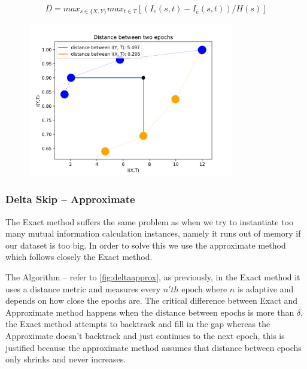   \begin{equation}
    D = max_{s\in\{X, Y\}} max_{t\in T} [(I_e(s, t) - I_{\hat{e}}(s, t)) / H(s)]
    \label{eq:distance2}
  \end{equation} 

  \begin{figure}[H]
    \centering
    \includegraphics[width=0.80\textwidth]{figs/ip_pair.png}
    \label{fig:ip_pair}
  \end{figure}

\subsubsection{Delta Skip -- Approximate}

  The Exact method suffers the same problem as when we try to instantiate too
  many mutual information calculation instances, namely it runs out of memory if
  our dataset is too big. In order to solve this we use the approximate method
  which follows closely the Exact method. 

  The Algorithm -- refer to \autoref{fig:deltaapprox}, as previously, in the
  Exact method it uses a distance metric and measures every $n'th$ epoch where
  $n$ is adaptive and depends on how close the epochs are. The critical
  difference between Exact and Approximate method happens when the distance
  between epochs is more than $\delta$, the Exact method attempts to backtrack
  and fill in the gap whereas the Approximate doesn't backtrack and just
  continues to the next epoch, this is justified because the approximate method
  assumes that distance between epochs only shrinks and never increases.

